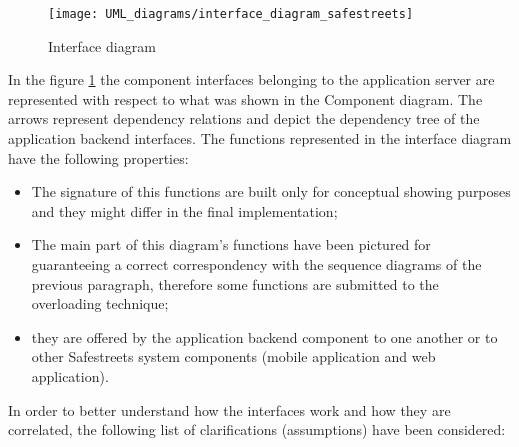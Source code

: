 \begin{figure}[H]
    \centering
    \texttt{[image: UML\_diagrams/interface\_diagram\_safestreets]}
    \caption{Interface diagram}
    \label{fig:interface_diagram}
\end{figure}
In the figure \ref{fig:interface_diagram} the component interfaces belonging to the application server are represented with respect to what was shown in the Component diagram. The arrows represent dependency relations and depict the dependency tree of the application backend interfaces. 
The functions represented in the interface diagram have the following properties:
\begin{itemize}
    \item The signature of this functions are built only for conceptual showing purposes and they might differ in the final implementation;
    \item The main part of this diagram's functions have been pictured for guaranteeing a correct correspondency with the sequence diagrams of the previous paragraph, therefore some functions are submitted to the overloading technique;
    \item they are offered by the application backend component to one another or to other Safestreets system components (mobile application and web application).
\end{itemize} 
In order to better understand how the interfaces work and how they are correlated, the following list of clarifications (assumptions) have been considered:
